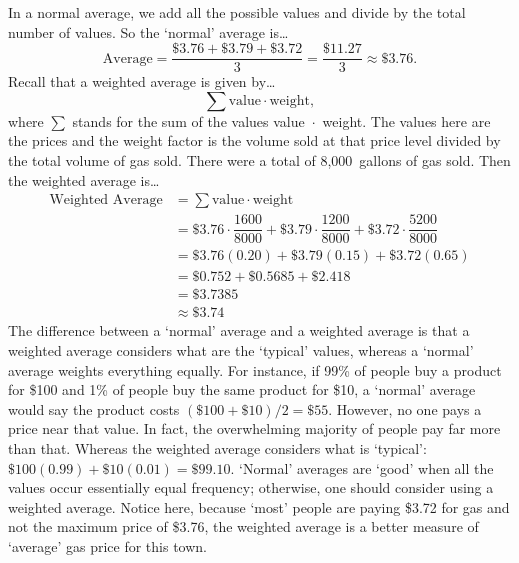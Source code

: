 \documentclass[11pt,letterpaper]{article}
\begin{document}
\sol In a normal average, we add all the possible values and divide by the total number of values. So the `normal' average is\dots 
	\[
	\text{Average}= \dfrac{\$3.76 + \$3.79 + \$3.72}{3}= \dfrac{\$11.27}{3} \approx \$3.76.
	\]
Recall that a weighted average is given by\dots 
	\[
	\sum \text{value} \cdot \text{weight},
	\] 
where $\sum$ stands for the sum of the values value~$\cdot$~weight. The values here are the prices and the weight factor is the volume sold at that price level divided by the total volume of gas sold. There were a total of 8,000~gallons of gas sold. Then the weighted average is\dots
	\[
	\begin{aligned}
	\text{Weighted Average}&= \sum \text{value} \cdot \text{weight} \\[0.3cm]
	&= \$3.76 \cdot \dfrac{1600}{8000} + \$3.79 \cdot \dfrac{1200}{8000} + \$3.72 \cdot \dfrac{5200}{8000} \\[0.3cm]
	&= \$3.76 (0.20) + \$3.79 (0.15) + \$3.72 (0.65) \\[0.3cm]
	&= \$0.752 + \$0.5685 + \$2.418 \\[0.3cm]
	&= \$3.7385 \\[0.3cm]
	&\approx \$3.74
	\end{aligned}
	\]
The difference between a `normal' average and a weighted average is that a weighted average considers what are the `typical' values, whereas a `normal' average weights everything equally. For instance, if 99\% of people buy a product for \$100 and 1\% of people buy the same product for \$10, a `normal' average would say the product costs $(\$100 + \$10)/2= \$55$. However, no one pays a price near that value. In fact, the overwhelming majority of people pay far more than that. Whereas the weighted average considers what is `typical': $\$100(0.99) + \$10(0.01)= \$99.10$. `Normal' averages are `good' when all the values occur essentially equal frequency; otherwise, one should consider using a weighted average. Notice here, because `most' people are paying \$3.72 for gas and not the maximum price of \$3.76, the weighted average is a better measure of `average' gas price for this town. 
\end{document}
